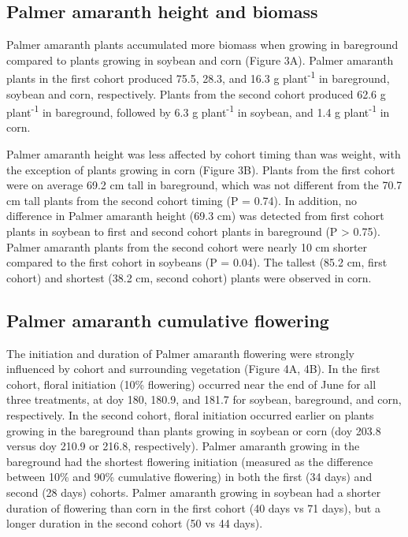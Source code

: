 \documentclass[utf8]{frontiersSCNS}
\begin{document}
\hypertarget{palmer-amaranth-height-and-biomass}{%
\subsection*{Palmer amaranth height and
biomass}\label{palmer-amaranth-height-and-biomass}}

Palmer amaranth plants accumulated more biomass when growing in
bareground compared to plants growing in soybean and corn (Figure 3A).
Palmer amaranth plants in the first cohort produced 75.5, 28.3, and 16.3
g plant\textsuperscript{-1} in bareground, soybean and corn,
respectively. Plants from the second cohort produced 62.6 g
plant\textsuperscript{-1} in bareground, followed by 6.3 g
plant\textsuperscript{-1} in soybean, and 1.4 g
plant\textsuperscript{-1} in corn.

Palmer amaranth height was less affected by cohort timing than was
weight, with the exception of plants growing in corn (Figure 3B). Plants
from the first cohort were on average 69.2 cm tall in bareground, which
was not different from the 70.7 cm tall plants from the second cohort
timing (P = 0.74). In addition, no difference in Palmer amaranth height
(69.3 cm) was detected from first cohort plants in soybean to first and
second cohort plants in bareground (P \textgreater{} 0.75). Palmer
amaranth plants from the second cohort were nearly 10 cm shorter
compared to the first cohort in soybeans (P = 0.04). The tallest (85.2
cm, first cohort) and shortest (38.2 cm, second cohort) plants were
observed in corn.

\hypertarget{palmer-amaranth-cumulative-flowering}{%
\subsection*{Palmer amaranth cumulative
flowering}\label{palmer-amaranth-cumulative-flowering}}

The initiation and duration of Palmer amaranth flowering were strongly
influenced by cohort and surrounding vegetation (Figure 4A, 4B). In the
first cohort, floral initiation (10\% flowering) occurred near the end
of June for all three treatments, at doy 180, 180.9, and 181.7 for
soybean, bareground, and corn, respectively. In the second cohort,
floral initiation occurred earlier on plants growing in the bareground
than plants growing in soybean or corn (doy 203.8 versus doy 210.9 or
216.8, respectively). Palmer amaranth growing in the bareground had the
shortest flowering initiation (measured as the difference between 10\%
and 90\% cumulative flowering) in both the first (34 days) and second
(28 days) cohorts. Palmer amaranth growing in soybean had a shorter
duration of flowering than corn in the first cohort (40 days vs 71
days), but a longer duration in the second cohort (50 vs 44 days).
\end{document}
